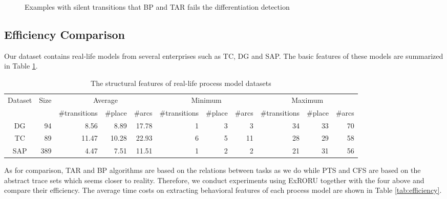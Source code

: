 \documentclass[dvips,...]{llncs}
\begin{document}
\begin{figure}[htbp]
{\begin{minipage}[b]{0.38\textwidth}
	\end{minipage}
	\label{fig:silentExampleC}
}
\caption{Examples with silent transitions that BP and TAR fails the differentiation detection\label{fig:silentExamples}}
\end{figure}

\subsection{Efficiency Comparison}\label{subsec:efficiency}
Our dataset contains real-life models from several enterprises such as TC, DG and SAP. The basic features of these models are summarized in Table \ref{tab:datasets}.

\begin{table}[htbp]
\centering
\caption{The structural features of real-life process model datasets\label{tab:datasets}}
\scriptsize
\begin{tabular}{|c|r|r|r|r|r|r|r|r|r|r|} \hline
	\multicolumn{1}{|c|}{\multirow{2}{*}{Dataset}} & \multicolumn{1}{c|}{\multirow{2}{*}{Size}} & \multicolumn{3}{|c}{Average} & \multicolumn{3}{|c}{Minimum} & \multicolumn{3}{|c|}{Maximum}\\ \cline{3-11}
	\multicolumn{1}{|c|}{} & \multicolumn{1}{c|}{} & \multicolumn{1}{c|}{\#transitions} & \multicolumn{1}{c|}{\#place} & \multicolumn{1}{c|}{\#arcs} & \multicolumn{1}{c|}{\#transitions} & \multicolumn{1}{c|}{\#place} & \multicolumn{1}{c|}{\#arcs} & \multicolumn{1}{c|}{\#transitions} & \multicolumn{1}{c|}{\#place} & \multicolumn{1}{c|}{\#arcs}\\ \hline
	DG & 94 & 8.56 & 8.89 & 17.78 & 1 & 3 & 3 & 34 & 33 & 70 \\ \hline
	TC & 89 & 11.47 & 10.28 & 22.93 & 6 & 5 & 11 & 28 & 29 & 58 \\ \hline
	SAP & 389 & 4.47 & 7.51 & 11.51 & 1 & 2 & 2 & 21 & 31 & 56 \\ \hline
\end{tabular}
\end{table}

As for comparison, TAR and BP algorithms are based on the relations between tasks as we do while PTS and CFS are based on the abstract trace sets which seems closer to reality. Therefore, we conduct experiments using ExRORU together with the four above and compare their efficiency. The average time costs on extracting behavioral features of each process model are shown in Table \ref{tab:efficiency}.
\end{document}
